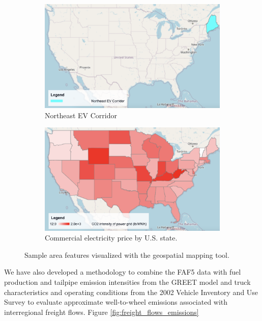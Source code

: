 \begin{figure}[ht]
    \centering
    \begin{subfigure}[b]{0.49\textwidth}
        \centering
        \includegraphics[width=\textwidth]{figures/northeast_ev_corridor.png}
        \caption{Northeast EV Corridor}
        \label{fig:northeast_ev_corridor}
    \end{subfigure}
    \hfill
    \begin{subfigure}[b]{0.49\textwidth}
        \centering
        \includegraphics[width=\textwidth]{figures/grid_co2_intensity_state.png}
        \caption{Commercial electricity price by U.S. state.}
        \label{fig:grid_co2_intensity_state}
    \end{subfigure}
    \caption{Sample area features visualized with the geospatial mapping tool.}
    \label{fig:area_features}
\end{figure}

We have also developed a methodology to combine the FAF5 data with fuel production and tailpipe emission intensities from the GREET model \cite{GREET_2022} and truck characteristics and operating conditions from the 2002 Vehicle Inventory and Use Survey \cite{VIUS_2002} to evaluate approximate well-to-wheel emissions associated with interregional freight flows. Figure \ref{fig:freight_flows_emissions}

